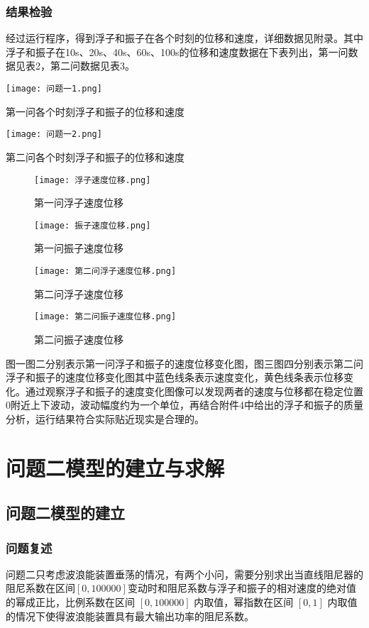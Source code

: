 \documentclass[a4paper,12pt]{article}
\begin{document}
	\subsubsection{结果检验}
	经过运行程序，得到浮子和振子在各个时刻的位移和速度，详细数据见附录。其中浮子和振子在10s、20s、40s、60s、100s的位移和速度数据在下表列出，第一问数据见表2，第二问数据见表3。
	\begin{table}[H]
		\centering
		\texttt{[image: 问题一1.png]}
		\caption{第一问各个时刻浮子和振子的位移和速度}
		\label{fig:表1}
	\end{table}
	\begin{table}[H]
		\centering
		\texttt{[image: 问题一2.png]}
		\caption{第二问各个时刻浮子和振子的位移和速度}
		\label{fig:表2}
	\end{table}
	\begin{figure}[H]
		\centering
		\texttt{[image: 浮子速度位移.png]}
		\caption{第一问浮子速度位移}
		\label{fig:图1}
	\end{figure}
	\begin{figure}[H]
		\centering
		\texttt{[image: 振子速度位移.png]}
		\caption{第一问振子速度位移}
		\label{fig:图2}
	\end{figure}	
	\begin{figure}[H]
		\centering
		\texttt{[image: 第二问浮子速度位移.png]}
		\caption{第二问浮子速度位移}
		\label{fig:图3}
	\end{figure}
	\begin{figure}[H]
		\centering
		\texttt{[image: 第二问振子速度位移.png]}
		\caption{第二问振子速度位移}
		\label{fig:图4}
	\end{figure}	
	图一图二分别表示第一问浮子和振子的速度位移变化图，图三图四分别表示第二问浮子和振子的速度位移变化图其中蓝色线条表示速度变化，黄色线条表示位移变化。通过观察浮子和振子的速度变化图像可以发现两者的速度与位移都在稳定位置0附近上下波动，波动幅度约为一个单位，再结合附件4中给出的浮子和振子的质量分析，运行结果符合实际贴近现实是合理的。
	\section{问题二模型的建立与求解}
	\subsection{问题二模型的建立}
	\subsubsection{问题复述}
	问题二只考虑波浪能装置垂荡的情况，有两个小问，需要分别求出当直线阻尼器的阻尼系数在区间$[0,100000]$变动时和阻尼系数与浮子和振子的相对速度的绝对值的幂成正比，比例系数在区间 $[0,100000]$ 内取值，幂指数在区间 $[0,1]$ 内取值的情况下使得波浪能装置具有最大输出功率的阻尼系数。
\end{document}
